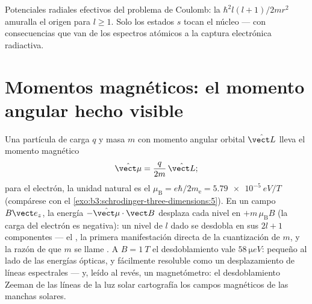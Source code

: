 \begin{omfigure}

{\small Potenciales radiales efectivos del problema de Coulomb: la
 $\hbar^2l(l+1)/2mr^2$ amuralla el origen para
$l \ge 1$. Solo los estados $s$ tocan el núcleo --- con consecuencias que
van de los espectros atómicos a la captura electrónica radiactiva.}
\end{omfigure}

\section{Momentos magnéticos: el momento angular hecho visible}

\begin{proposition}\label{prop:b3:quantum-angular-momentum:magnetic}
Una partícula de carga $q$ y masa $m$ con momento angular orbital
$\hat{\vect L}$ lleva el momento magnético
\[
\hat{\vect\mu} = \frac{q}{2m}\,\hat{\vect L} ;
\]
para el electrón, la unidad natural es el \emph{}
$\mu_{\text{B}} = e\hbar/2m_{\text{e}} = \qty{5.79e-5}{eV/T}$
(compárese con el \cref{exo:b3:schrodinger-three-dimensions:5}). En un campo
$B\vect e_z$, la energía $-\hat{\vect\mu}\cdot\vect B$ desplaza cada
nivel en $+m\,\mu_{\text{B}}B$ (la carga del electrón es negativa): un nivel
de $l$ dado se desdobla en sus $2l + 1$ componentes --- el
\emph{}, la primera manifestación directa de la cuantización
de $m$, y la razón de que $m$ se llame .
A $B = \qty{1}{T}$ el desdoblamiento vale $\qty{58}{\micro eV}$: pequeño
al lado de las energías ópticas, y fácilmente resoluble como un
desplazamiento de líneas espectrales --- y, leído al revés, un magnetómetro:
el desdoblamiento Zeeman de las líneas de la luz solar cartografía los
campos magnéticos de las manchas solares.
\end{proposition}

